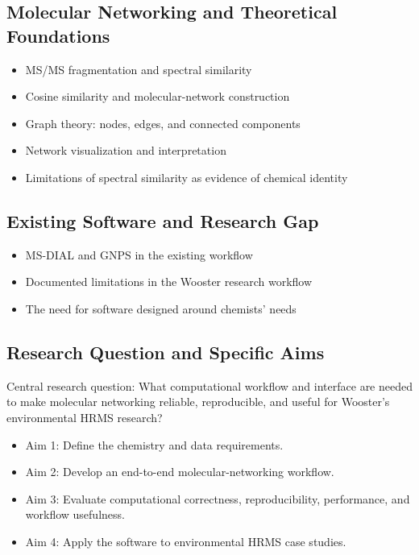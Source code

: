 \documentclass[11pt]{article}
\begin{document}
\begin{doublespace}
    \subsection{Molecular Networking and Theoretical Foundations}
        \begin{itemize}
            \item MS/MS fragmentation and spectral similarity
            \item Cosine similarity and molecular-network construction
            \item Graph theory: nodes, edges, and connected components
            \item Network visualization and interpretation
            \item Limitations of spectral similarity as evidence of chemical identity
        \end{itemize}
    
    \subsection{Existing Software and Research Gap}
        \begin{itemize}
            \item MS-DIAL and GNPS in the existing workflow
            \item Documented limitations in the Wooster research workflow
            \item The need for software designed around chemists' needs
        \end{itemize}
    
    \subsection{Research Question and Specific Aims}
        Central research question: What computational workflow and interface are needed to make molecular networking reliable, reproducible, and useful for Wooster's environmental HRMS research?
        \begin{itemize}
        \item Aim 1: Define the chemistry and data requirements.
        \item Aim 2: Develop an end-to-end molecular-networking workflow.
        \item Aim 3: Evaluate computational correctness, reproducibility, performance, and workflow usefulness.
        \item Aim 4: Apply the software to environmental HRMS case studies.
        \end{itemize}
    

\end{doublespace}
\end{document}
